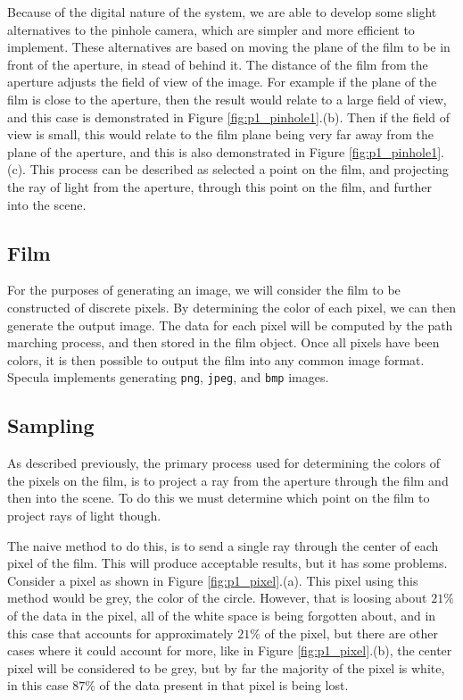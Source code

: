\documentclass[../pbr.tex]{subfile}
\begin{document}
Because of the digital nature of the system, we are able to develop some slight
alternatives to the pinhole camera, which are simpler and more efficient to
implement. These alternatives are based on moving the plane of the film to be
in front of the aperture, in stead of behind it. The distance of the film from
the aperture adjusts the field of view of the image. For example if the plane
of the film is close to the aperture, then the result would relate to a large
field of view, and this case is demonstrated in Figure
\ref{fig:p1_pinhole1}.(b). Then if the field of view is small, this would
relate to the film plane being very far away from the plane of the aperture,
and this is also demonstrated in Figure \ref{fig:p1_pinhole1}.(c). This process
can be described as selected a point on the film, and projecting the ray of
light from the aperture, through this point on the film, and further into the
scene.

\subsection{Film}%
\label{sub:film}

For the purposes of generating an image, we will consider the film to be
constructed of discrete pixels. By determining the color of each pixel, we can
then generate the output image. The data for each pixel will be computed by the
path marching process, and then stored in the film object. Once all pixels have
been colors, it is then possible to output the film into any common image
format. Specula implements generating \texttt{png}, \texttt{jpeg}, and
\texttt{bmp} images.

\subsection{Sampling}%
\label{sub:sampling}

As described previously, the primary process used for determining the colors of
the pixels on the film, is to project a ray from the aperture through the film
and then into the scene. To do this we must determine which point on the film
to project rays of light though.

The naive method to do this, is to send a single ray through the center of each
pixel of the film. This will produce acceptable results, but it has some
problems. Consider a pixel as shown in Figure \ref{fig:p1_pixel}.(a). This pixel
using this method would be grey, the color of the circle. However, that is
loosing about $21\%$ of the data in the pixel, all of the white space is being
forgotten about, and in this case that accounts for approximately $21\%$ of the
pixel, but there are other cases where it could account for more, like in
Figure \ref{fig:p1_pixel}.(b), the center pixel will be considered to be grey,
but by far the majority of the pixel is white, in this case $87\%$ of the data
present in that pixel is being lost.
\end{document}
